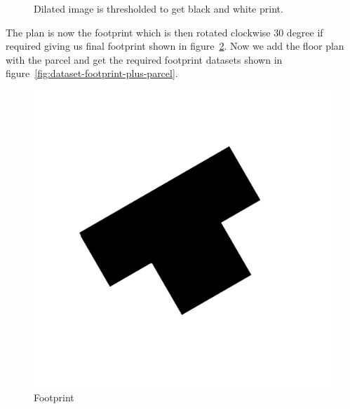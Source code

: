 \begin{figure}[h]
\begin{minipage}{.45\textwidth}
                    \caption{Dilated image is thresholded to get black and white print.}
                    \label{fig:dataset-final-difference-thresholded}
                \end{minipage}
            \end{figure}    
            \break 
            The plan is now the footprint which is then rotated clockwise 30 degree if required giving us final footprint shown in figure~\ref{fig:dataset-footprint}. Now we add the floor plan with the parcel and get the required footprint datasets shown in figure~\ref{fig:dataset-footprint-plus-parcel}. 
            \begin{figure}[h]
                \centering
                \begin{minipage}{.45\textwidth}
                    \centering
                    \includegraphics[width=.8\linewidth,frame]{img/experiment/dataset/10footprint_rotated.jpg}
                    \caption{Footprint}
                    \label{fig:dataset-footprint}
                \end{minipage}%
                \hfill
                \begin{minipage}{.45\textwidth}
                    \centering

\end{minipage}
\end{figure}
